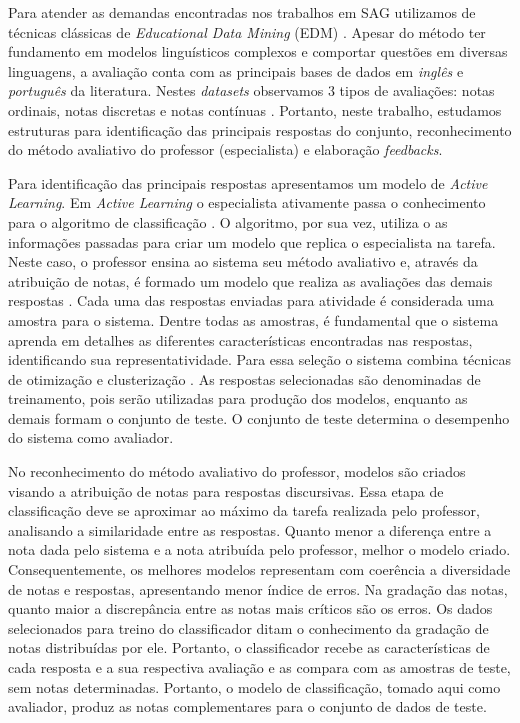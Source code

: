 Para atender as demandas encontradas nos trabalhos em SAG utilizamos de técnicas clássicas de \textit{Educational Data Mining} (EDM) \cite{romero2010}. Apesar do método ter fundamento em modelos linguísticos complexos e comportar questões em diversas linguagens, a avaliação conta com as principais bases de dados em \textit{inglês} e \textit{português} da literatura. Nestes \textit{datasets} observamos 3 tipos de avaliações: notas ordinais, notas discretas e notas contínuas \cite{morettin2010}. Portanto, neste trabalho, estudamos estruturas para identificação das principais respostas do conjunto, reconhecimento do método avaliativo do professor (especialista) e elaboração \textit{feedbacks}.

Para identificação das principais respostas apresentamos um modelo de \textit{Active Learning}. Em \textit{Active Learning} o especialista ativamente passa o conhecimento para o algoritmo de classificação \cite{silva2007, miller2020}. O algoritmo, por sua vez, utiliza o as informações passadas para criar um modelo que replica o especialista na tarefa. Neste caso, o professor ensina ao sistema seu método avaliativo e, através da atribuição de notas, é formado um modelo que realiza as avaliações das demais respostas \cite{romero2010}. Cada uma das respostas enviadas para atividade é considerada uma amostra para o sistema. Dentre todas as amostras, é fundamental que o sistema aprenda em detalhes as diferentes características encontradas nas respostas, identificando sua representatividade. Para essa seleção o sistema combina técnicas de otimização e clusterização \cite{everitt2011, spalenza2019}. As respostas selecionadas são denominadas de treinamento, pois serão utilizadas para produção dos modelos, enquanto as demais formam o conjunto de teste. O conjunto de teste determina o desempenho do sistema como avaliador.

No reconhecimento do método avaliativo do professor, modelos são criados visando a atribuição de notas para respostas discursivas. Essa etapa de classificação deve se aproximar ao máximo da tarefa realizada pelo professor, analisando a similaridade entre as respostas. Quanto menor a diferença entre a nota dada pelo sistema e a nota atribuída pelo professor, melhor o modelo criado. Consequentemente, os melhores modelos representam com coerência a diversidade de notas e respostas, apresentando menor índice de erros. Na gradação das notas, quanto maior a discrepância entre as notas mais críticos são os erros. Os dados selecionados para treino do classificador ditam o conhecimento da gradação de notas distribuídas por ele. Portanto, o classificador recebe as características de cada resposta e a sua respectiva avaliação e as compara com as amostras de teste, sem notas determinadas. Portanto, o modelo de classificação, tomado aqui como avaliador, produz as notas complementares para o conjunto de dados de teste.

